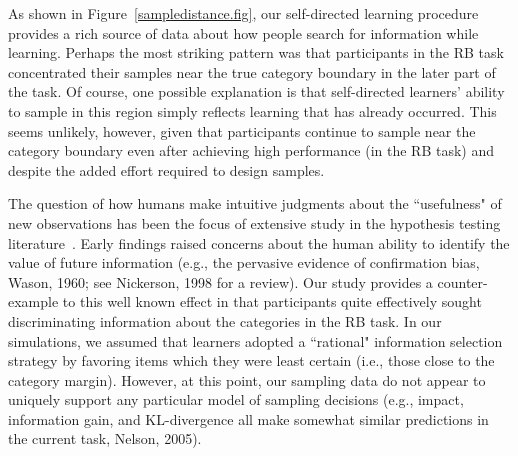 \documentclass[3p,twocolumn,authoryear,10pt]{elsarticle}
\begin{document}
As shown in Figure~\ref{sampledistance.fig}, our self-directed learning procedure provides a rich source of
data about how people search for information while learning.  Perhaps the most  striking pattern was that participants in the RB task concentrated their samples near the true category boundary in the later part of the task.  Of course, one possible explanation is that self-directed learners' ability to sample in this region simply reflects learning that has already occurred. This seems unlikely, however, given that participants continue to sample near the category boundary even after achieving high performance (in the RB task) and despite the added effort required to design samples. 

The question of how humans 
make intuitive judgments about the ``usefulness" of new observations has been the focus of extensive study in the hypothesis testing 
literature~\citep{Wason:1960gf,Skov:1986jw,Klayman:1987os,Oaksford:1994tw,Ginzberg:1996bh}.  
Early findings raised concerns about the human ability to identify the value of future information (e.g., the pervasive evidence of confirmation bias, Wason, 1960; see Nickerson, 1998 for a review).   Our study provides a
counter-example to this well known effect in that participants quite effectively sought discriminating information about the
categories in the RB task. In our simulations, we assumed that learners adopted a ``rational" information selection strategy by favoring items which they were least certain (i.e., those close to the category margin).   However, at this point, our sampling data do not appear to uniquely support any particular model of sampling decisions (e.g., impact, information gain, and KL-divergence all make somewhat similar predictions in the current task, Nelson, 2005).  

\end{document}

